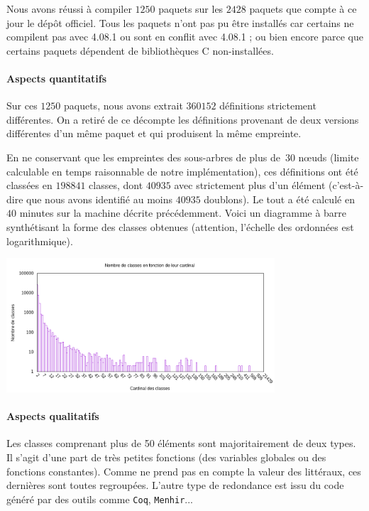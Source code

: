 Nous avons réussi à compiler $1250$ paquets sur les $2428$ paquets que
compte à ce jour le dépôt {\Opam} officiel. Tous les paquets n'ont pas
pu être installés car
certains ne compilent pas avec {\OCaml} 4.08.1 ou
sont en conflit avec {\OCaml} 4.08.1 ; ou bien encore parce que
certains paquets dépendent de bibliothèques C non-installées.

\paragraph{Aspects quantitatifs}

Sur ces $1250$ paquets, nous avons extrait $360152$ définitions
strictement différentes. On a retiré de ce décompte les définitions
provenant de deux versions différentes d'un même paquet et qui
produisent la même empreinte.

En ne conservant que les empreintes des sous-arbres de plus de~$30$
nœuds (limite calculable en temps raisonnable de notre
implémentation), ces définitions ont été classées en $198841$ classes,
dont $40935$ avec strictement plus d'un élément (c'est-à-dire que nous
avons identifié au moins $40935$ doublons). Le tout a été calculé en
$40$ minutes sur la machine décrite précédemment. Voici un diagramme à
barre synthétisant la forme des classes obtenues (attention,
l'échelle des ordonnées est logarithmique).

\begin{center}
\includegraphics[width=10cm]{figures/bars.png}
\end{center}

\paragraph{Aspects qualitatifs}

Les classes comprenant plus de 50 éléments sont majoritairement de
deux types. Il s'agit d'une part de très petites fonctions (des
variables globales ou des fonctions constantes). Comme {\Asak} ne
prend pas en compte la valeur des littéraux, ces dernières sont toutes
regroupées. L'autre type de redondance est issu du code généré par des
outils comme \verb|Coq|, \verb|Menhir|...

